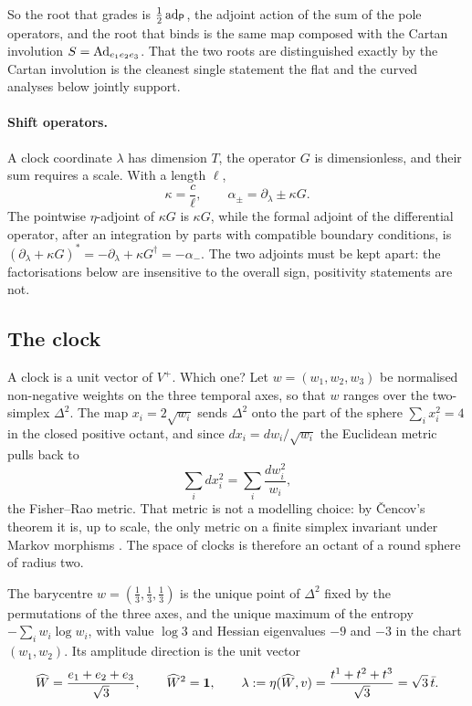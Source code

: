 So the root that grades is $\tfrac12\operatorname{ad}_{\mathsf P}$, the adjoint action of the sum of the pole operators, and the root that binds
is the same map composed with the Cartan involution $S=\operatorname{Ad}_{e_1e_2e_3}$. That the two roots are distinguished exactly by the
Cartan involution is the cleanest single statement the flat and the curved analyses below jointly support.

\paragraph{Shift operators.} A clock coordinate $\lambda$ has dimension $T$, the operator $G$ is dimensionless, and their sum
requires a scale. With a length $\ell$,
\begin{equation}
\label{eq:kappa}
\kappa=\frac c\ell,\qquad \alpha_\pm=\partial_\lambda\pm\kappa G .
\end{equation}
The pointwise $\eta$-adjoint of $\kappa G$ is $\kappa G$, while the formal adjoint of the differential operator, after an integration by
parts with compatible boundary conditions, is $(\partial_\lambda+\kappa G)^*=-\partial_\lambda+\kappa G^\dagger=-\alpha_-$. The two
adjoints must be kept apart: the factorisations below are insensitive to the overall sign, positivity statements are not.

\subsection{The clock}
\label{sec:clocksimplex}

A clock is a unit vector of $V^+$. Which one? Let $w=(w_1,w_2,w_3)$ be normalised non-negative weights on the three temporal
axes, so that $w$ ranges over the two-simplex $\Delta^2$. The map $x_i=2\sqrt{w_i}$ sends $\Delta^2$ onto the part of the sphere
$\sum_ix_i^2=4$ in the closed positive octant, and since $dx_i=dw_i/\sqrt{w_i}$ the Euclidean metric pulls back to
\[
\sum_idx_i^2=\sum_i\frac{dw_i^2}{w_i},
\]
the Fisher--Rao metric. That metric is not a modelling choice: by \v{C}encov's theorem it is, up to scale, the only metric on a
finite simplex invariant under Markov morphisms \cite{Cencov,AmariNagaoka}. The space of clocks is therefore an octant of a round
sphere of radius two.

\begin{proposition}
\label{prop:clock}
The barycentre $w=(\tfrac13,\tfrac13,\tfrac13)$ is the unique point of $\Delta^2$ fixed by the permutations of the three axes, and the
unique maximum of the entropy $-\sum_iw_i\log w_i$, with value $\log3$ and Hessian eigenvalues $-9$ and $-3$ in the chart
$(w_1,w_2)$. Its amplitude direction is the unit vector
\[
\widehat W=\frac{e_1+e_2+e_3}{\sqrt3},\qquad \widehat W^2=\mathbf 1,\qquad
\lambda:=\eta(\widehat W,v)=\frac{t^1+t^2+t^3}{\sqrt3}=\sqrt3\,\bar t .
\]
\end{proposition}

